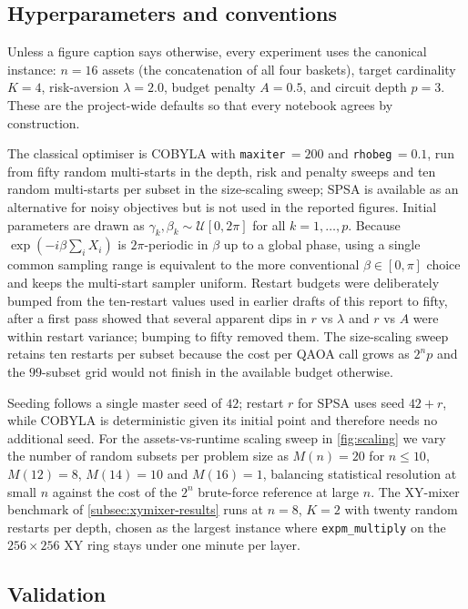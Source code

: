 \subsection{Hyperparameters and conventions}\label{subsec:hyperparams}

Unless a figure caption says otherwise, every experiment uses the canonical instance: $n=16$ assets (the concatenation of all four baskets), target cardinality $K=4$, risk-aversion $\lambda=2.0$, budget penalty $A=0.5$, and circuit depth $p=3$. These are the project-wide defaults so that every notebook agrees by construction.

The classical optimiser is COBYLA with \texttt{maxiter}\,$=200$ and \texttt{rhobeg}\,$=0.1$, run from fifty random multi-starts in the depth, risk and penalty sweeps and ten random multi-starts per subset in the size-scaling sweep; SPSA is available as an alternative for noisy objectives but is not used in the reported figures. Initial parameters are drawn as $\gamma_k,\beta_k \sim \mathcal{U}[0, 2\pi]$ for all $k=1,\dots,p$. Because $\exp(-i\beta\sum_i X_i)$ is $2\pi$-periodic in $\beta$ up to a global phase, using a single common sampling range is equivalent to the more conventional $\beta\in[0,\pi]$ choice and keeps the multi-start sampler uniform. Restart budgets were deliberately bumped from the ten-restart values used in earlier drafts of this report to fifty, after a first pass showed that several apparent dips in $r$ vs $\lambda$ and $r$ vs $A$ were within restart variance; bumping to fifty removed them. The size-scaling sweep retains ten restarts per subset because the cost per QAOA call grows as $2^n p$ and the $99$-subset grid would not finish in the available budget otherwise.

Seeding follows a single master seed of $42$; restart $r$ for SPSA uses seed $42+r$, while COBYLA is deterministic given its initial point and therefore needs no additional seed. For the assets-vs-runtime scaling sweep in \cref{fig:scaling} we vary the number of random subsets per problem size as $M(n) = 20$ for $n\leq 10$, $M(12)=8$, $M(14)=10$ and $M(16)=1$, balancing statistical resolution at small $n$ against the cost of the $2^n$ brute-force reference at large $n$. The XY-mixer benchmark of \cref{subsec:xymixer-results} runs at $n=8$, $K=2$ with twenty random restarts per depth, chosen as the largest instance where \texttt{expm\_multiply} on the $256\times 256$ XY ring stays under one minute per layer.

\subsection{Validation}\label{subsec:validation}

